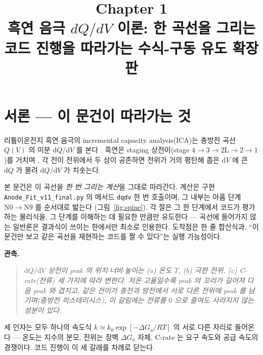 \documentclass[11pt,a4paper]{article}
\title{\textbf{\LARGE Chapter 1}\\[0.35em]\Large 흑연 음극 $dQ/dV$ 이론: 한 곡선을 그리는 코드 진행을 따라가는 수식-구동 유도 확장판}
\author{}
\date{}
\newcommand{\dd}{\mathrm{d}}
\newcommand{\code}[1]{\texttt{#1}}
\begin{document}
\maketitle

\section*{서론 — 이 문건이 따라가는 것}
리튬이온전지 흑연 음극의 incremental capacity analysis(ICA)는 충방전 곡선 $Q(V)$ 의 미분
$\dd Q/\dd V$ 를 본다 \cite{bloom2005,dubarry2012}. 흑연은 staging 상전이(stage
$4\!\to\!3\!\to\!2\mathrm L\!\to\!2\!\to\!1$)를 거치며 \cite{dahn1991,ohzuku1993}, 각 전이 전위에서
두 상이 공존하면 전위가 거의 평탄해 좁은 $\dd V$ 에 큰 $\dd Q$ 가 몰려 $\dd Q/\dd V$ 가 치솟는다.

본 문건은 이 곡선을 \emph{한 번 그리는 계산}을 그대로 따라간다. 계산은 구현 \code{Anode\_Fit\_v11\_final.py}
의 메서드 \code{dqdv} 한 번 호출이며, 그 내부는 아홉 단계 $\mathrm N0\!\to\!\mathrm N9$ 를 순서대로 밟는다
(그림~\ref{fig:spine}). 각 절은 그 한 단계에서 코드가 평가하는 물리식을, 그 단계를 이해하는 데 필요한 만큼만
유도한다 — 곡선에 들어가지 않는 일반론은 결과식이 쓰이는 한에서만 최소로 인용한다. 도착점은 한 줄 합산식과,
``이 문건만 보고 같은 곡선을 재현하는 코드를 짤 수 있다''는 실행 가능성이다.

\textbf{관측.}
\begin{quote}\itshape
$\dd Q/\dd V$ 상전이 peak 의 위치$\cdot$너비$\cdot$높이는 (a) 온도 $T$, (b) 극판 전위, (c) C-rate(전류)
세 가지에 따라 변한다. 저온$\cdot$고율일수록 peak 의 꼬리가 길어져 다음 peak 와 겹치고, 같은 전이가 충전과 방전에서
서로 다른 전위에 peak 를 남기며(충방전 히스테리시스), 이 갈림에는 전류를 $0$ 으로 줄여도 사라지지 않는 성분이 있다.
\end{quote}

세 인자는 모두 하나의 속도식 $k\simeq k_0\exp[-\Delta G_a/RT]$ 의 서로 다른 자리로 들어온다 \cite{bazant2013} — 온도는 지수의 분모,
전위는 장벽 $\Delta G_a$ 자체, C-rate 는 요구 속도와 공급 속도의 경쟁이다. 코드 진행이 이 세 갈래를 차례로 닫는다.
\end{document}

